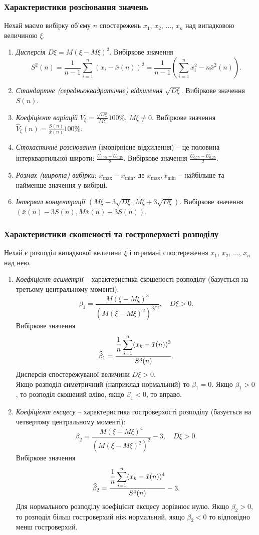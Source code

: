 \subsubsection{Характеристики розсіювання значень}
Нехай маємо вибірку об'єму $n$ спостережень $x_1$, $x_2$, $\ldots$, $x_n$ над випадковою величиною $\xi$.
\begin{enumerate}
	\item \textit{Дисперсія} $D\xi = M(\xi - M\xi)^2$. Вибіркове значення \[ S^2(n) = \dfrac{1}{n-1} \sum_{i=1}^n (x_i - \bar{x}(n))^2 = \dfrac{1}{n-1} \left(\sum_{i=1}^n x_i^2 - n\bar{x}^2(n) \right). \]
	\item \textit{Стандартне (середньоквадратичне) відхилення} $\sqrt{D\xi}$. Вибіркове значення $S(n)$.
	\item \textit{Коефіцієнт варіацій} $V_\xi = \frac{\sqrt{D\xi}}{M\xi} 100\%$, $M\xi\ne0$. Вибіркове значення $\widehat{V}_\xi(n)=\frac{S(n)}{\bar x(n)} 100\%$.
	\item \textit{Стохастичне розсіювання} (імовірнісне відхилення) -- це половина інтерквартильної широти: $\frac{U_{0.75} - U_{0.25}}{2}$. Вибіркове значення $\frac{\widehat{U}_{0.75} - \widehat{U}_{0.25}}{2}$.
	\item \textit{Розмах (широта) вибірки}: $x_{\max}-x_{\min}$, де $x_{\max}, x_{\min}$ -- найбільше та найменше значення у вибірці.
	\item \textit{Інтервал концентрації} $(M\xi - 3\sqrt{D\xi}, M\xi + 3 \sqrt{D\xi})$. Вибіркове значення $(\bar x(n) - 3S(n), M\bar x(n) + 3 S(n))$.
\end{enumerate}
\subsubsection{Характеристики скошеності та гостроверхості розподілу}
Нехай є розподіл випадкової величини $\xi$ і отримані спостереження $x_1$, $x_2$, $\ldots$, $x_n$ над нею.
\begin{enumerate}
	\item \textit{Коефіцієнт асиметрії} -- характеристика скошеності розподілу (базується на третьому центральному моменті): \[ \beta_1 = \dfrac{M(\xi - M\xi)^3}{(M(\xi - M\xi)^2)^{3/2}}, \quad D\xi > 0. \] Вибіркове значення \[ \widehat{\beta}_1 = \dfrac{\dfrac{1}{n}\displaystyle\sum\limits_{i=1}^n(x_k - \bar{x}(n))^3}{S^3(n)}. \] Дисперсія спостережуваної величини $D\xi > 0$. \\ %

	Якщо розподіл симетричний (наприклад нормальний) то $\beta_1 =0$. Якщо $\beta_1 > 0$, то розподіл скошений вліво, якщо $\beta_1 < 0$, то вправо.
	\item \textit{Коефіцієнт ексцесу} -- характеристика гостроверхості розподілу (базується на четвертому центральному моменті): \[ \beta_2 = \dfrac{M(\xi-M\xi)^4}{(M(\xi-M\xi)^2)^2} - 3, \quad D\xi > 0. \] Вибіркове значення \[ \widehat{\beta}_2 = \dfrac{\dfrac{1}{n}\displaystyle\sum\limits_{i=1}^n(x_k - \bar{x}(n))^4}{S^4(n)} - 3. \]
	Для нормального розподілу коефіцієнт ексцесу дорівнює нулю. Якщо $\beta_2 > 0$, то розподіл більш гостроверхий ніж нормальний, якщо $\beta_2 < 0$ то відповідно менш гостроверхий.
\end{enumerate}
